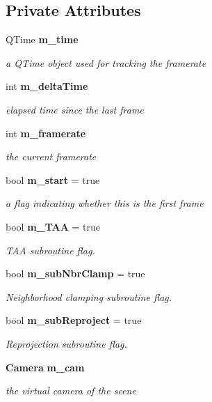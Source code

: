 \subsection*{Private Attributes}
\begin{DoxyCompactItemize}
\item 
Q\+Time \textbf{ m\+\_\+time}
\begin{DoxyCompactList}\small\item\em a Q\+Time object used for tracking the framerate \end{DoxyCompactList}\item 
int \textbf{ m\+\_\+delta\+Time}
\begin{DoxyCompactList}\small\item\em elapsed time since the last frame \end{DoxyCompactList}\item 
int \textbf{ m\+\_\+framerate}
\begin{DoxyCompactList}\small\item\em the current framerate \end{DoxyCompactList}\item 
bool \textbf{ m\+\_\+start} = true
\begin{DoxyCompactList}\small\item\em a flag indicating whether this is the first frame \end{DoxyCompactList}\item 
bool \textbf{ m\+\_\+\+T\+AA} = true
\begin{DoxyCompactList}\small\item\em T\+AA subroutine flag. \end{DoxyCompactList}\item 
bool \textbf{ m\+\_\+sub\+Nbr\+Clamp} = true
\begin{DoxyCompactList}\small\item\em Neighborhood clamping subroutine flag. \end{DoxyCompactList}\item 
bool \textbf{ m\+\_\+sub\+Reproject} = true
\begin{DoxyCompactList}\small\item\em Reprojection subroutine flag. \end{DoxyCompactList}\item 
\textbf{ Camera} \textbf{ m\+\_\+cam}
\begin{DoxyCompactList}\small\item\em the virtual camera of the scene \end{DoxyCompactList}\item 

\end{DoxyCompactItemize}
